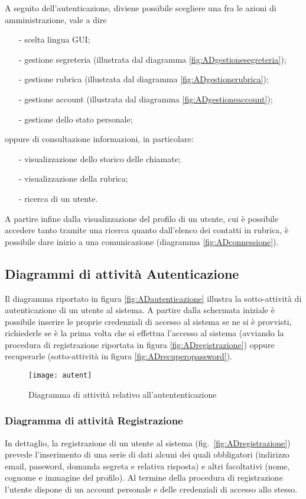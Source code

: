 A seguito dell'autenticazione, diviene possibile scegliere una fra le azioni di amministrazione, vale a dire
\begin{itemize}[noitemsep,nolistsep]
  \item[-] scelta lingua GUI;
  \item[-] gestione segreteria (illustrata dal diagramma \ref{fig:ADgestionesegreteria});
  \item[-] gestione rubrica (illustrata dal diagramma \ref{fig:ADgestionerubrica});
  \item[-] gestione account (illustrata dal diagramma \ref{fig:ADgestioneaccount});
  \item[-] gestione dello stato personale;
\end{itemize}
oppure di consultazione informazioni, in particolare:
\begin{itemize}[noitemsep,nolistsep]
  \item[-] visualizzazione dello storico delle chiamate;
  \item[-] visualizzazione della rubrica;
  \item[-] ricerca di un utente.
\end{itemize}

A partire infine dalla visualizzazione del profilo di un utente, cui è possibile accedere tanto tramite una ricerca quanto dall'elenco dei contatti in rubrica, è possibile dare inizio a una comunicazione (diagramma \vref{fig:ADconnessione}).

\subsection{Diagrammi di attività Autenticazione}
Il diagramma riportato in figura \vref{fig:ADautenticazione} illustra la sotto-attività di autenticazione di un utente al sistema. A partire dalla schermata iniziale è possibile inserire le proprie credenziali di accesso al sistema se ne si è provvisti, richiederle se è la prima volta che si effettua l'accesso al sistema (avviando la procedura di registrazione riportata in figura \ref{fig:ADregistrazione}) oppure recuperarle (sotto-attività in figura \vref{fig:ADrecuperopassword}).

\begin{figure}[H]
  \centering
  \texttt{[image: autent]}
  \caption{Diagramma di attività relativo all'autententicazione}\label{fig:ADautenticazione}
\end{figure}

\subsubsection{Diagramma di attività Registrazione}
In dettaglio, la registrazione di un utente al sistema (fig.~\vref{fig:ADregistrazione}) prevede l'inserimento di una serie di dati alcuni dei quali obbligatori (indirizzo email, password, domanda segreta e relativa risposta) e altri facoltativi (nome, cognome e immagine del profilo). Al termine della procedura di registrazione l'utente dispone di un account personale e delle credenziali di accesso allo stesso.

